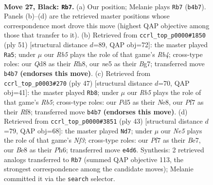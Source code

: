 \documentclass[11pt]{article}
\begin{document}
\clearpage

\begin{figure}[p]\centering
\begin{subfigure}{0.46\textwidth}\centering
\resizebox{\linewidth}{!}{%
\newchessgame
\chessboard[
  setfen={r2qb1k1/p4pp1/7p/p2pN1P1/1r2n2P/PP1B4/1Q3P2/R3R1K1 b - - 0 27},
  showmover=false,
  pgfstyle=straightmove, color=movearrow, markmove={b4-b7}
]}
\caption{}
\end{subfigure}\hfill
\begin{subfigure}{0.46\textwidth}\centering
\resizebox{\linewidth}{!}{%
\newchessgame
\chessboard[
  setfen={3k3r/2p1p1b1/8/1rqP1p1p/B3p1nP/5P2/1PP1Q1P1/1KB1R2R b - - 0 26},
  showmover=false,
  pgfstyle=straightmove, color=movearrow, markmove={b5-a5}
]}
\caption{}
\end{subfigure}
\\[4pt]
\begin{subfigure}{0.46\textwidth}\centering
\resizebox{\linewidth}{!}{%
\newchessgame
\chessboard[
  setfen={4nr2/3bqpk1/2p3p1/p1NpP3/1r4P1/1BP1Q2P/1P6/1K1R3R b - - 0 24},
  showmover=false,
  pgfstyle=straightmove, color=movearrow, markmove={b4-b8}
]}
\caption{}
\end{subfigure}\hfill
\begin{subfigure}{0.46\textwidth}\centering
\resizebox{\linewidth}{!}{%
\newchessgame
\chessboard[
  setfen={4k2r/4bpp1/p2p1n1p/4pPP1/2q4P/1rN1BP2/1PQ5/1K1R3R b k - 0 22},
  showmover=false,
  pgfstyle=straightmove, color=movearrow, markmove={f6-d7}
]}
\caption{}
\end{subfigure}
\caption{\textbf{Move 27, Black: \texttt{Rb7}.} (a) Our position; Melanie plays \texttt{Rb7} (\texttt{b4b7}). Panels (b)--(d) are the retrieved master positions whose correspondence most drove this move (highest QAP objective among those that transfer to it). (b) Retrieved from \texttt{ccrl\_top\_p0000\#1850} (ply 51) [structural distance $d$=89, QAP obj=72]: the master played \texttt{Ra5}; under $\mu$ our \emph{Rb5} plays the role of that game's \emph{Rb4}; cross-type roles: our \emph{Q}d8 as their \emph{R}h8, our \emph{n}e5 as their \emph{B}g7; transferred move \texttt{b4b7} \textbf{(endorses this move)}. (c) Retrieved from \texttt{ccrl\_top\_p0003\#270} (ply 47) [structural distance $d$=70, QAP obj=41]: the master played \texttt{Rb8}; under $\mu$ our \emph{Rb5} plays the role of that game's \emph{Rb5}; cross-type roles: our \emph{P}d5 as their \emph{N}e8, our \emph{P}f7 as their \emph{R}f8; transferred move \texttt{b4b7} \textbf{(endorses this move)}. (d) Retrieved from \texttt{ccrl\_top\_p0000\#3851} (ply 43) [structural distance $d$=79, QAP obj=68]: the master played \texttt{Nd7}; under $\mu$ our \emph{Ne5} plays the role of that game's \emph{Nf3}; cross-type roles: our \emph{P}f7 as their \emph{B}e7, our \emph{B}e8 as their \emph{P}h6; transferred move \texttt{e4d6}. Synthesis: 2 retrieved analogs transferred to \texttt{Rb7} (summed QAP objective 113, the strongest correspondence among the candidate moves); Melanie committed it via the \texttt{search} selector.}
\label{fig:thought-m53}
\end{figure}
\end{document}
